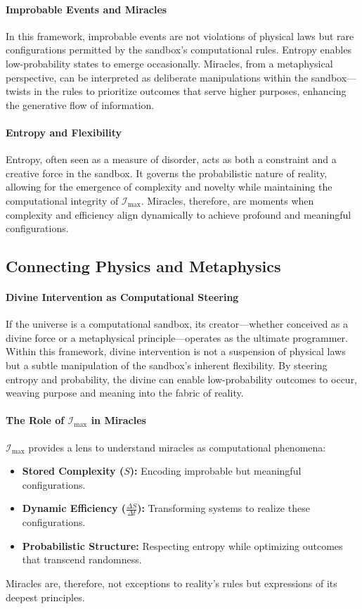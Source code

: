 \documentclass[12pt]{article}
\begin{document}
\paragraph{Improbable Events and Miracles}
In this framework, improbable events are not violations of physical laws but rare configurations permitted by the sandbox’s computational rules. Entropy enables low-probability states to emerge occasionally. Miracles, from a metaphysical perspective, can be interpreted as deliberate manipulations within the sandbox—twists in the rules to prioritize outcomes that serve higher purposes, enhancing the generative flow of information.

\paragraph{Entropy and Flexibility}
Entropy, often seen as a measure of disorder, acts as both a constraint and a creative force in the sandbox. It governs the probabilistic nature of reality, allowing for the emergence of complexity and novelty while maintaining the computational integrity of \(\mathcal{I}_{\text{max}}\). Miracles, therefore, are moments when complexity and efficiency align dynamically to achieve profound and meaningful configurations.

\subsection{Connecting Physics and Metaphysics}

\paragraph{Divine Intervention as Computational Steering}
If the universe is a computational sandbox, its creator—whether conceived as a divine force or a metaphysical principle—operates as the ultimate programmer. Within this framework, divine intervention is not a suspension of physical laws but a subtle manipulation of the sandbox’s inherent flexibility. By steering entropy and probability, the divine can enable low-probability outcomes to occur, weaving purpose and meaning into the fabric of reality.

\paragraph{The Role of \(\mathcal{I}_{\text{max}}\) in Miracles}
\(\mathcal{I}_{\text{max}}\) provides a lens to understand miracles as computational phenomena:
\begin{itemize}
    \item \textbf{Stored Complexity (\(S\)):} Encoding improbable but meaningful configurations.
    \item \textbf{Dynamic Efficiency (\(\frac{\Delta S}{\Delta t}\)):} Transforming systems to realize these configurations.
    \item \textbf{Probabilistic Structure:} Respecting entropy while optimizing outcomes that transcend randomness.
\end{itemize}
Miracles are, therefore, not exceptions to reality’s rules but expressions of its deepest principles.
\end{document}
